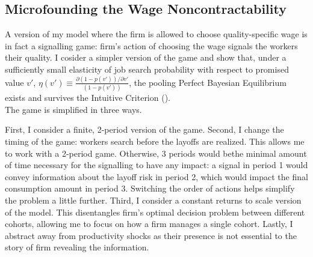 \subsection{Microfounding the Wage Noncontractability} \label{microfoundation}
A version of my model where the firm is allowed to choose quality-specific wage is in fact a signalling game: firm's action of choosing the wage signals the workers their quality.
I cosider a simpler version of the game and show that, under a sufficiently small elasticity of job search probability with respect to promised value $v'$, $\eta(v')\equiv\frac{\partial (1-p(v')) /\partial v'}{(1-p(v'))}$, the pooling Perfect Bayesian Equilibrium exists and survives the Intuitive Criterion (\textcite{Cho1987}). \\
The game is simplified in three ways.

First, I consider a finite, 2-period version of the game. Second, I change the timing of the game: workers search before the layoffs are realized. This allows me to work with a 2-period game. Otherwise,
3 periods would bethe minimal amount of time necessary for the signalling to have any impact: a signal in period 1 would convey information about the layoff risk in period 2, which would impact the final consumption amount in period 3. Switching the order of actions helps simplify the problem a little further.
Third, I consider a constant returns to scale version of the model. This disentangles firm's optimal decision problem between different cohorts, allowing me to focus on how a firm manages a single cohort.
Lastly, I abstract away from productivity shocks as their presence is not essential to the story of firm revealing the information. 


